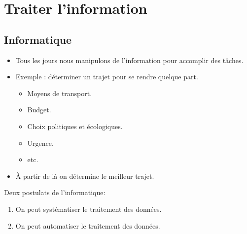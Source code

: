 \section[Traiter]{Traiter l'information}

\subsection{Informatique}

\begin{slide}
	\begin{itemize}
	\item Tous les jours nous manipulons de l'information pour accomplir des tâches.
	\item Exemple : déterminer un trajet pour se rendre quelque part.
		
		\begin{itemize}
			\item Moyens de transport.
			\item Budget.
			\item Choix politiques et écologiques.
			\item Urgence.
			\item etc.
		\end{itemize}
	\item À partir de là on détermine le meilleur trajet.
	
	\end{itemize}
\end{slide}

\begin{slide}

Deux postulats de l'informatique:
	\begin{enumerate}
		\item On peut systématiser le traitement des données.
		\item On peut automatiser le traitement des données.
	\end{enumerate}
\end{slide}


